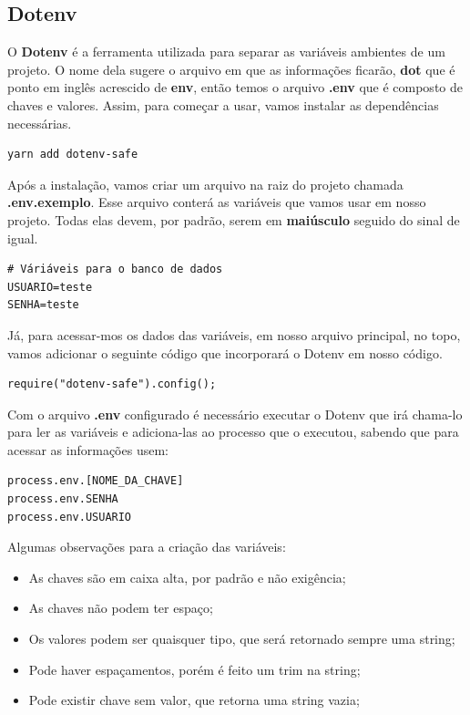 \subsection{Dotenv}

O \textbf{Dotenv} é a ferramenta utilizada para separar as variáveis ambientes de um projeto. O nome dela sugere o arquivo em que as informações ficarão, \textbf{dot} que é ponto em inglês acrescido de \textbf{env}, então temos o arquivo \textbf{.env} que é composto de chaves e valores. Assim, para começar a usar, vamos instalar as dependências necessárias.

\begin{verbatim}
yarn add dotenv-safe
\end{verbatim}

Após a instalação, vamos criar um arquivo na raiz do projeto chamada \textbf{.env.exemplo}. Esse arquivo conterá as variáveis que vamos usar em nosso projeto. Todas elas devem, por padrão, serem em \textbf{maiúsculo} seguido do sinal de igual. 

\begin{verbatim}
# Váriáveis para o banco de dados
USUARIO=teste
SENHA=teste
\end{verbatim}

Já, para acessar-mos os dados das variáveis, em nosso arquivo principal, no topo, vamos adicionar o seguinte código que incorporará o Dotenv em nosso código.

\begin{verbatim}
require("dotenv-safe").config();
\end{verbatim} 

Com o arquivo \textbf{.env} configurado é necessário executar o Dotenv que irá chama-lo para ler as variáveis e adiciona-las ao processo que o executou, sabendo que para acessar as informações usem:

\begin{verbatim}
process.env.[NOME_DA_CHAVE]
process.env.SENHA
process.env.USUARIO
\end{verbatim}

Algumas observações para a criação das variáveis: 

\begin{itemize}[leftmargin=1.7cm]
	\setlength\itemsep{0em}
	\item As chaves são em caixa alta, por padrão e não exigência;
	\item As chaves não podem ter espaço;
	\item Os valores podem ser quaisquer tipo, que será retornado sempre uma string;
	\item Pode haver espaçamentos, porém é feito um trim na string;
	\item Pode existir chave sem valor, que retorna uma string vazia;
\end{itemize}

